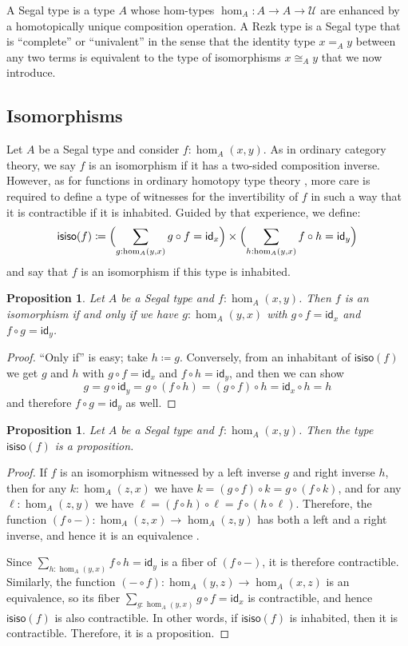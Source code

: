 \documentclass{amsart}
\theoremstyle{plain}
\newtheorem{prop}[thm]{Proposition}
\theoremstyle{definition}
\theoremstyle{remark}
\numberwithin{equation}{section}
\newcommand{\defeq}{\coloneqq}
\newcommand{\univtype}{\mathcal{U}}
\newcommand{\idarr}[1]{\mathsf{id}_{#1}}
\newcommand{\isiso}[1]{\mathsf{isiso}(#1)}
\newcommand{\Parens}[1]{\Bigl(#1\Bigr)}
\begin{document}
A Segal type is a type $A$ whose hom-types $\hom_A : A \to A \to \univtype$ are enhanced by a homotopically unique composition operation. A Rezk type is a Segal type that is ``complete'' or ``univalent'' in the sense that the identity type $x  =_A y$ between any two terms is equivalent to the type of isomorphisms $x \cong_A y$ that we now introduce.

\subsection{Isomorphisms}
\label{sec:isos}

Let $A$ be a Segal type and consider $f : \hom_A(x,y)$. As in ordinary category theory, we say $f$ is an isomorphism if it has a two-sided composition inverse. However, as for functions in ordinary homotopy type theory \cite[Chapter 4]{hottbook}, more care is required to define a type of witnesses for the invertibility of $f$ in such a way that it is contractible if it is inhabited. Guided by that experience, we define:
\[\isiso f \defeq \Parens{\sum_{g:\hom_A(y,x)} g\circ f = \idarr x}
\times \Parens{\sum_{h:\hom_A(y,x)} f\circ h = \idarr y} \]
and say that $f$ is an isomorphism if this type is inhabited.

\begin{prop}
  Let $A$ be a Segal type and $f:\hom_A(x,y)$.
  Then $f$ is an isomorphism if and only if we have $g:\hom_A(y,x)$ with $g\circ f = \idarr x$ and $f\circ g = \idarr y$.
\end{prop}
\begin{proof}
  ``Only if'' is easy; take $h\defeq g$.
  Conversely, from an inhabitant of $\isiso f$ we get $g$ and $h$ with $g\circ f = \idarr x$ and $f\circ h = \idarr y$, and then we can show
  \[ g = g \circ \idarr y = g \circ (f\circ h) = (g\circ f) \circ h = \idarr x \circ h = h \]
  and therefore $f\circ g = \idarr y$ as well.
\end{proof}

\begin{prop} Let $A$ be a Segal type and $f : \hom_A(x,y)$. Then the type $\isiso f$ is a proposition.
\end{prop}
\begin{proof}
If $f$ is an isomorphism witnessed by a left inverse $g$ and right inverse $h$, then for any $k:\hom_A(z,x)$ we have $k = (g\circ f)\circ k = g\circ (f\circ k)$, and for any $\ell:\hom_A(z,y)$ we have $\ell = (f\circ h)\circ \ell = f\circ (h\circ \ell)$.
Therefore, the function $(f\circ -) : \hom_A(z,x) \to \hom_A(z,y)$ has both a left and a right inverse, and hence it is an equivalence \cite[4.3.3]{hottbook}.

Since $\sum_{h:\hom_A(y,x)} f\circ h = \idarr y$ is a fiber of $(f\circ -)$, it is therefore contractible.
Similarly, the function $(-\circ f) : \hom_A(y,z) \to \hom_A(x,z)$ is an equivalence, so its fiber $\sum_{g:\hom_A(y,x)} g\circ f = \idarr x$ is contractible, and hence $\isiso f$ is also contractible. In other words, if $\isiso f$ is inhabited, then it is contractible.
Therefore, it is a proposition.
\end{proof}
\end{document}

